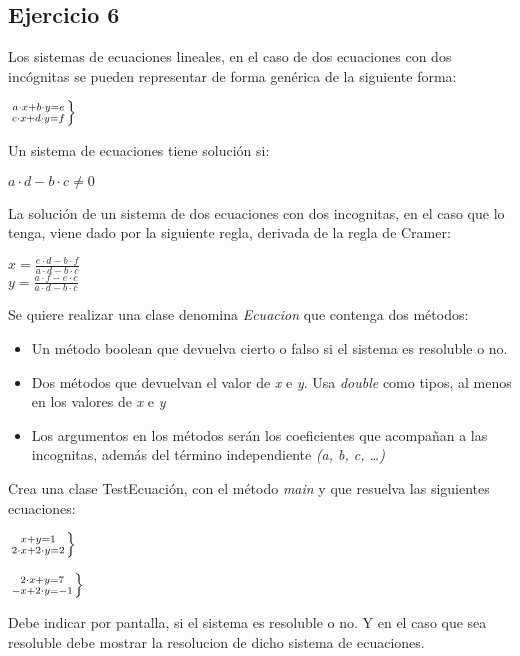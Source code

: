 \documentclass[4paper]{article}
\begin{document}
\subsection{Ejercicio 6}
Los sistemas de ecuaciones lineales, en el caso de dos ecuaciones con dos incógnitas se pueden representar de forma genérica de la siguiente forma:
\begin{large}
\begin{center}
$\left.
a \cdot x + b \cdot y  = e \atop
c \cdot x + d \cdot y = f
\right\}$
\end{center}
\end{large}
Un sistema de ecuaciones tiene solución si:
\begin{center}
$a \cdot d - b \cdot c  \not= 0$
\end{center}
La solución de un sistema de dos ecuaciones con dos incognitas, en el caso que lo tenga, viene dado por la siguiente regla, derivada de la regla de Cramer:
\begin{large}
\begin{center}
$x = \frac{e \cdot d - b \cdot f}{a \cdot d - b \cdot c}$ \\
\vspace*{0.2cm}
$y = \frac{a \cdot f - e \cdot c}{a \cdot d - b \cdot c}$
\end{center}
\end{large}
Se quiere realizar una clase denomina \emph{Ecuacion} que contenga dos métodos:
\begin{itemize}
\item Un método boolean que devuelva cierto o falso si el sistema es resoluble o no.
\item Dos métodos que devuelvan el valor de \emph{x} e \emph{y}. Usa \emph{double} como tipos, al menos en los valores de \emph{x} e \emph{y}
\item Los argumentos en los métodos serán los coeficientes que acompañan a las incognitas, además del término independiente \emph{(a, b, c, \dots)}
\end{itemize}
Crea una clase TestEcuación, con el método \emph{main} y que resuelva las siguientes ecuaciones:
\begin{large}
\begin{center}
$\left.
x + y  = 1 \atop
2 \cdot x + 2 \cdot y = 2
\right\}$
\end{center}
\end{large}
\begin{large}
\begin{center}
$\left.
2 \cdot x + y  = 7 \atop
-x + 2 \cdot y = -1
\right\}$
\end{center}
\end{large}
Debe indicar por pantalla, si el sistema es resoluble o no. Y en el caso que sea resoluble debe mostrar la resolucion de dicho sistema de ecuaciones.
\end{document}
